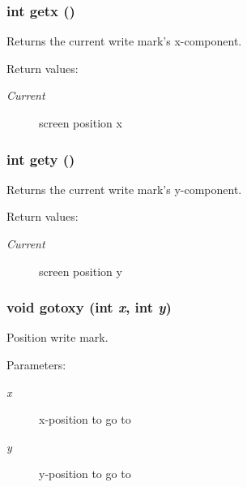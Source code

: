 \subsubsection{\setlength{\rightskip}{0pt plus 5cm}int getx ()}\label{hpconio_8h_a11}


Returns the current write mark's x-component.

\begin{Desc}
\item[Return values: ]\par
\begin{description}
\item[{\em 
Current}]screen position x \end{description}
\end{Desc}
\subsubsection{\setlength{\rightskip}{0pt plus 5cm}int gety ()}\label{hpconio_8h_a12}


Returns the current write mark's y-component.

\begin{Desc}
\item[Return values: ]\par
\begin{description}
\item[{\em 
Current}]screen position y \end{description}
\end{Desc}
\subsubsection{\setlength{\rightskip}{0pt plus 5cm}void gotoxy (int {\em x}, int {\em y})}\label{hpconio_8h_a15}


Position write mark.

\begin{Desc}
\item[Parameters: ]\par
\begin{description}
\item[{\em 
x}]x-position to go to \item[{\em 
y}]y-position to go to \end{description}
\end{Desc}
